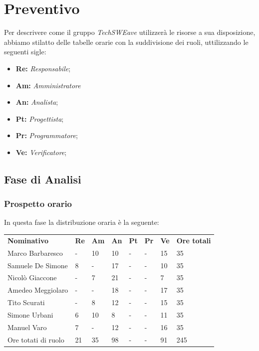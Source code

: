 \section{Preventivo}
Per descrivere come il gruppo \emph{TechSWEave} utilizzerà le risorse a sua disposizione, abbiamo stilatto delle tabelle orarie con la suddivisione dei ruoli, uttilizzando le seguenti sigle:
\begin{itemize}
    \item \textbf{Re: }\emph{Responsabile};
    \item \textbf{Am: }\emph{Amministratore}
    \item \textbf{An: }\emph{Analista};
    \item \textbf{Pt: }\emph{Progettista};
    \item \textbf{Pr: }\emph{Programmatore};
    \item \textbf{Ve: }\emph{Verificatore};
\end{itemize}

\subsection{Fase di Analisi}
    \subsubsection{Prospetto orario}
    In questa fase la distribuzione oraria è la seguente:

    \begin{center}
        \begin{table}[ht!]
            \centering
            \renewcommand{\arraystretch}{1.8}
            \begin{tabular}{p{100px} p{20px} p{20px} p{20px} p{20px} p{20px} p{20px} p{50px} }
                \rowcolor{logo!70} \textbf{Nominativo} & \textbf{Re} & \textbf{Am} & \textbf{An} & \textbf{Pt} & \textbf{Pr} & \textbf{Ve} & \textbf{Ore totali}\\
                Marco Barbaresco & - & 10 & 10 & - & - & 15 & 35\\
                Samuele De Simone & 8 & - & 17 & - & - & 10 & 35\\
                Nicolò Giaccone & - & 7 & 21 & - & - & 7 & 35\\
                Amedeo Meggiolaro & - & - & 18 & - & - & 17 & 35\\
                Tito Scurati & - & 8 & 12 & - & - & 15 & 35\\
                Simone Urbani & 6 & 10 & 8 & - & - & 11 & 35\\
                Manuel Varo & 7 & - & 12 & - & - & 16 & 35\\
                Ore totati di ruolo & 21 & 35 & 98 & - & - & 91 & 245\\
            \end{tabular}
        \end{table}
    \end{center}

